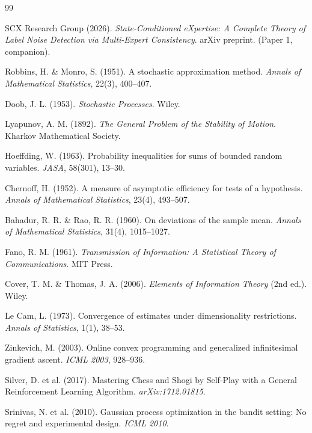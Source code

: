\documentclass[11pt,a4paper]{article}
\theoremstyle{plain}
\theoremstyle{definition}
\theoremstyle{remark}
\begin{document}
\begin{thebibliography}{99}

SCX Research Group (2026).
\emph{State-Conditioned eXpertise: A Complete Theory of Label Noise Detection via Multi-Expert Consistency}.
arXiv preprint. (Paper 1, companion).

Robbins, H. \& Monro, S. (1951).
A stochastic approximation method.
\emph{Annals of Mathematical Statistics}, 22(3), 400--407.

Doob, J. L. (1953).
\emph{Stochastic Processes}. Wiley.

Lyapunov, A. M. (1892).
\emph{The General Problem of the Stability of Motion}.
Kharkov Mathematical Society.

Hoeffding, W. (1963).
Probability inequalities for sums of bounded random variables.
\emph{JASA}, 58(301), 13--30.

Chernoff, H. (1952).
A measure of asymptotic efficiency for tests of a hypothesis.
\emph{Annals of Mathematical Statistics}, 23(4), 493--507.

Bahadur, R. R. \& Rao, R. R. (1960).
On deviations of the sample mean.
\emph{Annals of Mathematical Statistics}, 31(4), 1015--1027.

Fano, R. M. (1961).
\emph{Transmission of Information: A Statistical Theory of Communications}. MIT Press.

Cover, T. M. \& Thomas, J. A. (2006).
\emph{Elements of Information Theory} (2nd ed.). Wiley.

Le Cam, L. (1973).
Convergence of estimates under dimensionality restrictions.
\emph{Annals of Statistics}, 1(1), 38--53.

Zinkevich, M. (2003).
Online convex programming and generalized infinitesimal gradient ascent.
\emph{ICML 2003}, 928--936.

Silver, D. et al. (2017).
Mastering Chess and Shogi by Self-Play with a General Reinforcement Learning Algorithm.
\emph{arXiv:1712.01815}.

Srinivas, N. et al. (2010).
Gaussian process optimization in the bandit setting: No regret and experimental design.
\emph{ICML 2010}.


\end{thebibliography}
\end{document}
